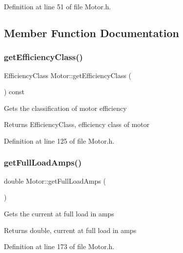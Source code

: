 Definition at line 51 of file Motor.\+h.



\subsection{Member Function Documentation}
\mbox{\label{class_motor_a5d0078bdc164e5ed14334373f183be55}} 
\subsubsection{\texorpdfstring{get\+Efficiency\+Class()}{getEfficiencyClass()}}
{\footnotesize\ttfamily Efficiency\+Class Motor\+::get\+Efficiency\+Class (\begin{DoxyParamCaption}{ }\end{DoxyParamCaption}) const\hspace{0.3cm}{\ttfamily [inline]}}

Gets the classification of motor efficiency \begin{DoxyReturn}{Returns}
Efficiency\+Class, efficiency class of motor 
\end{DoxyReturn}


Definition at line 125 of file Motor.\+h.

\mbox{\label{class_motor_a612eb0dabb9623ee8e0866046527d16a}} 
\subsubsection{\texorpdfstring{get\+Full\+Load\+Amps()}{getFullLoadAmps()}}
{\footnotesize\ttfamily double Motor\+::get\+Full\+Load\+Amps (\begin{DoxyParamCaption}{ }\end{DoxyParamCaption})\hspace{0.3cm}{\ttfamily [inline]}}

Gets the current at full load in amps \begin{DoxyReturn}{Returns}
double, current at full load in amps 
\end{DoxyReturn}


Definition at line 173 of file Motor.\+h.

